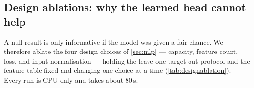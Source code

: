 %
%
%
%
%
%

\subsection{Design ablations: why the learned head cannot help}\label{sec:r-ablations}
A null result is only informative if the model was given a fair chance. We therefore ablate the
four design choices of \cref{sec:mlp} --- capacity, feature count, loss, and input normalisation
--- holding the leave-one-target-out protocol and the feature table fixed and changing one
choice at a time (\cref{tab:designablation}). Every run is CPU-only and takes about 80\,s.


